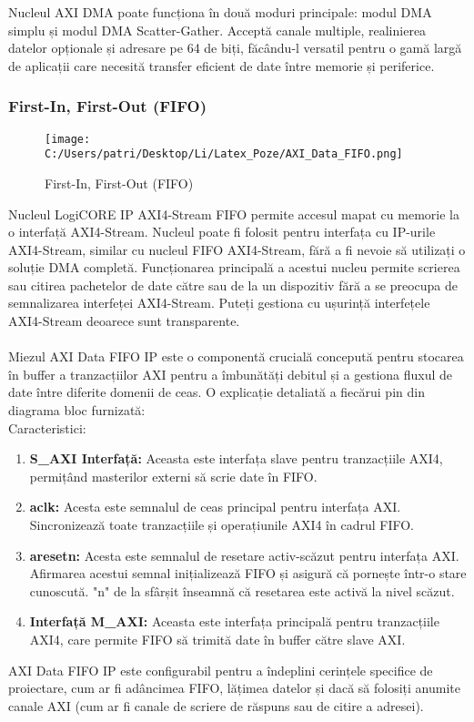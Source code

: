 \documentclass[12pt]{article}
\begin{document}
\hspace*{1cm}Nucleul AXI DMA poate funcționa în două moduri principale: modul DMA simplu și modul DMA Scatter-Gather. Acceptă canale multiple, realinierea datelor opționale și adresare pe 64 de biți, făcându-l versatil pentru o gamă largă de aplicații care necesită transfer eficient de date între memorie și periferice.



\subsubsection{First-In, First-Out (FIFO)} 

\begin{figure}[H]
    \centering
    \texttt{[image: C:/Users/patri/Desktop/Li/Latex\_Poze/AXI\_Data\_FIFO.png]}
    \caption{First-In, First-Out (FIFO)}
\end{figure}

\hspace*{1cm}Nucleul LogiCORE IP AXI4-Stream FIFO permite accesul mapat cu memorie la o interfață AXI4-Stream. Nucleul poate fi folosit pentru interfața cu IP-urile AXI4-Stream, similar cu nucleul FIFO AXI4-Stream, fără a fi nevoie să utilizați o soluție DMA completă.
Funcționarea principală a acestui nucleu permite scrierea sau citirea pachetelor de date către sau de la un dispozitiv fără a se preocupa de semnalizarea interfeței AXI4-Stream. Puteți gestiona cu ușurință interfețele AXI4-Stream deoarece sunt transparente.\\\\
\hspace*{1cm}Miezul AXI Data FIFO IP este o componentă crucială concepută pentru stocarea în buffer a tranzacțiilor AXI pentru a îmbunătăți debitul și a gestiona fluxul de date între diferite domenii de ceas. O explicație detaliată a fiecărui pin din diagrama bloc furnizată:\\
Caracteristici:
\begin{enumerate}
    \item \textbf{S\_AXI Interfață:} Aceasta este interfața slave pentru tranzacțiile AXI4, permițând masterilor externi să scrie date în FIFO.
    \item \textbf{aclk:} Acesta este semnalul de ceas principal pentru interfața AXI. Sincronizează toate tranzacțiile și operațiunile AXI4 în cadrul FIFO.
    \item \textbf{aresetn:} Acesta este semnalul de resetare activ-scăzut pentru interfața AXI. Afirmarea acestui semnal inițializează FIFO și asigură că pornește într-o stare cunoscută. "n" de la sfârșit înseamnă că resetarea este activă la nivel scăzut.
    \item \textbf{Interfață M\_AXI:} Aceasta este interfața principală pentru tranzacțiile AXI4, care permite FIFO să trimită date în buffer către slave AXI.
\end{enumerate}
\hspace*{1cm}AXI Data FIFO IP este configurabil pentru a îndeplini cerințele specifice de proiectare, cum ar fi adâncimea FIFO, lățimea datelor și dacă să folosiți anumite canale AXI (cum ar fi canale de scriere de răspuns sau de citire a adresei).
\end{document}
